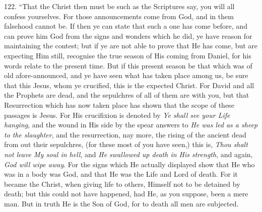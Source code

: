 122. ``That the Christ then
must be such as the Scriptures say, you will all confess yourselves.
For those announcements come from God, and in them falsehood cannot
be. If then ye can state that such a one has come before, and
can prove him God from the signs and wonders which he did, ye have
reason for maintaining the contest; but if ye are not able to prove
that He has come, but are expecting Him still, recognise the true
season of His coming from Daniel, for his words relate to the present
time. But if this present season be that which was of old
afore-announced, and ye have seen what has taken place among us, be
sure that this Jesus, whom ye crucified, this is the expected Christ.
For David and all the Prophets are dead, and the sepulchres of all of
them are with you, but that Resurrection which has now taken place has
shown that the scope of these passages is Jesus. For His crucifixion
is denoted by \emph{Ye shall see your Life hanging}, and the wound in
His side by the spear answers to \emph{He was led as a sheep to the
slaughter}, and the resurrection, nay more, the rising of the
ancient dead from out their sepulchres, (for these most of you have
seen,) this is, \emph{Thou shalt not leave My soul in hell}, and \emph{He
swallowed up death in His strength}, and again, \emph{God will wipe
away}. For the signs which He actually displayed show that He who
was in a body was God, and that He was the Life and Lord of death. For
it became the Christ, when giving life to others, Himself not to be
detained by death; but this could not have happened, had He, as you
suppose, been a mere man. But in truth He is the Son of God, for to
death all men are subjected.

